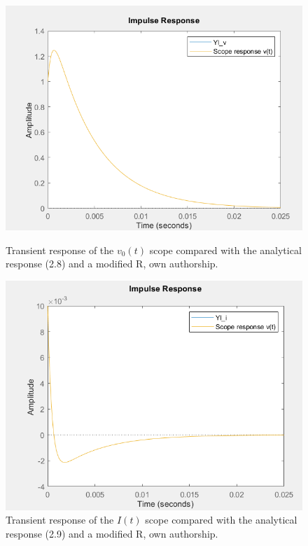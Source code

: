 \documentclass[a4paper,12pt]{article}
\begin{document}
\begin{figure}[H]
    \centering
    \begin{minipage}[b]{0.45\linewidth}
        \centering
        \includegraphics[width=\linewidth]{fonts_lab_2/scope_analytical_modified_v.png}
        \caption{Transient response of the $v_0(t)$ scope compared with the analytical response (2.8) and a modified R, own authorship.}
        \label{fig:scopeanalyticalmodifiedv}
    \end{minipage}
    \hspace{0.05\linewidth} %
    \begin{minipage}[b]{0.45\linewidth}
        \centering
        \includegraphics[width=\linewidth]{fonts_lab_2/scope_analytical_modified_i.png}
        \caption{Transient response of the $I(t)$ scope compared with the analytical response (2.9) and a modified R, own authorship.}
        \label{fig:scopeanalyticalmodifiedi}
    \end{minipage}
\end{figure}
\end{document}
